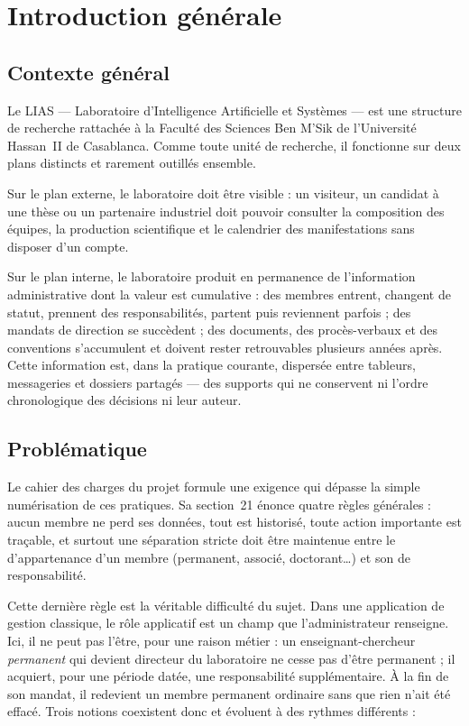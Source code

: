 \chapter{Introduction générale}
\label{ch:intro}

\section{Contexte général}

Le LIAS --- Laboratoire d'Intelligence Artificielle et Systèmes --- est une
structure de recherche rattachée à la Faculté des Sciences Ben M'Sik de l'Université
Hassan~II de Casablanca. Comme toute unité de recherche, il fonctionne sur deux plans
distincts et rarement outillés ensemble.

Sur le plan externe, le laboratoire doit être visible : un visiteur, un candidat à une
thèse ou un partenaire industriel doit pouvoir consulter la composition des équipes, la
production scientifique et le calendrier des manifestations sans disposer d'un compte.

Sur le plan interne, le laboratoire produit en permanence de l'information administrative
dont la valeur est cumulative : des membres entrent, changent de statut, prennent des
responsabilités, partent puis reviennent parfois ; des mandats de direction se succèdent ;
des documents, des procès-verbaux et des conventions s'accumulent et doivent rester
retrouvables plusieurs années après. Cette information est, dans la pratique courante,
dispersée entre tableurs, messageries et dossiers partagés --- des supports qui ne
conservent ni l'ordre chronologique des décisions ni leur auteur.

\section{Problématique}

Le cahier des charges du projet formule une exigence qui dépasse la simple numérisation
de ces pratiques. Sa section~21 énonce quatre règles générales : aucun membre ne perd ses
données, tout est historisé, toute action importante est traçable, et surtout une
séparation stricte doit être maintenue entre le \srt{} d'appartenance d'un membre
(permanent, associé, doctorant\dots) et son \rol{} de responsabilité.

Cette dernière règle est la véritable difficulté du sujet. Dans une application de gestion
classique, le rôle applicatif est un champ que l'administrateur renseigne. Ici, il ne peut
pas l'être, pour une raison métier : un enseignant-chercheur \emph{permanent} qui devient
directeur du laboratoire ne cesse pas d'être permanent ; il acquiert, pour une période
datée, une responsabilité supplémentaire. À la fin de son mandat, il redevient un membre
permanent ordinaire sans que rien n'ait été effacé. Trois notions coexistent donc et
évoluent à des rythmes différents :

